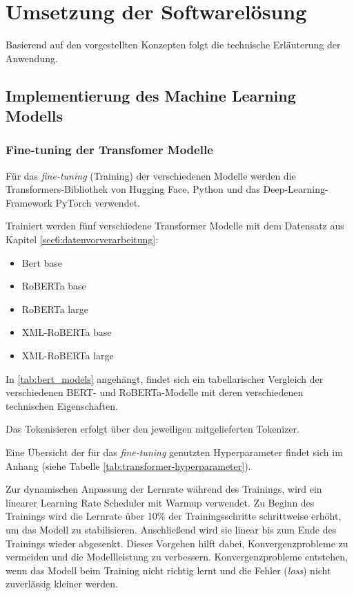 \chapter{Umsetzung der Softwarelösung}
\label{chap:umsetzung_des_prototyps}

Basierend auf den vorgestellten Konzepten folgt die technische Erläuterung der Anwendung.

\section{Implementierung des Machine Learning Modells}

\subsection{Fine-tuning der Transfomer Modelle}

Für das \textit{fine-tuning} (Training) der verschiedenen Modelle werden die Transformers-Bibliothek von Hugging Face, Python und das Deep-Learning-Framework PyTorch verwendet.

Trainiert werden fünf verschiedene Transformer Modelle mit dem Datensatz aus Kapitel \ref{sec6:datenvorverarbeitung}:
\begin{itemize}
    \item Bert base
    \item RoBERTa base
    \item RoBERTa large
    \item XML-RoBERTa base
    \item XML-RoBERTa large
\end{itemize}

In \ref{tab:bert_models} angehängt, findet sich ein tabellarischer Vergleich der verschiedenen BERT- und RoBERTa-Modelle mit deren verschiedenen technischen Eigenschaften.

Das Tokenisieren erfolgt über den jeweiligen mitgelieferten Tokenizer.

Eine Übersicht der für das \textit{fine-tuning} genutzten Hyperparameter findet sich im Anhang (siehe Tabelle \ref{tab:transformer-hyperparameter}).

Zur dynamischen Anpassung der Lernrate während des Trainings, wird ein linearer Learning Rate Scheduler mit Warmup verwendet.
Zu Beginn des Trainings wird die Lernrate über 10\% der Trainingsschritte schrittweise erhöht, um das Modell zu stabilisieren. 
Anschließend wird sie linear bis zum Ende des Trainings wieder abgesenkt. Dieses Vorgehen hilft dabei, Konvergenzprobleme zu vermeiden und die Modellleistung zu verbessern.
Konvergenzprobleme entstehen, wenn das Modell beim Training nicht richtig lernt und die Fehler (\textit{loss}) nicht zuverlässig kleiner werden.

